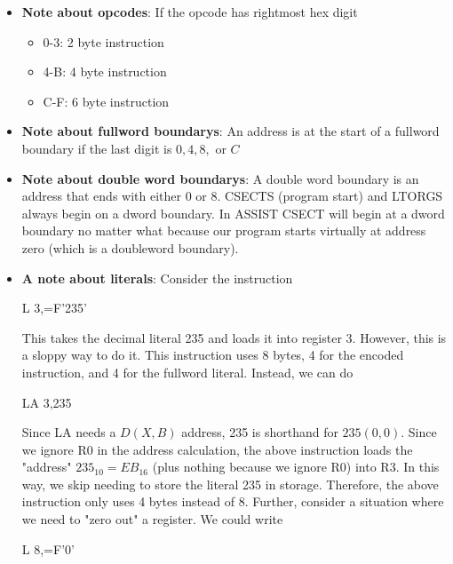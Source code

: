 \documentclass{report}
\begin{document}
\begin{itemize}
                \item \textbf{Note about opcodes}: If the opcode has rightmost hex digit
                    \begin{itemize}
                        \item 0-3: 2 byte instruction
                        \item 4-B: 4 byte instruction
                        \item C-F: 6 byte instruction
                    \end{itemize}
                \item \textbf{Note about fullword boundarys}: An address is at the start of a fullword boundary if the last digit is $0,4,8,$ or $C $
                \item \textbf{Note about double word boundarys}: A double word boundary is an address that ends with either 0 or 8.
                    \bigbreak \noindent 
                    CSECTS (program start) and LTORGS always begin on a dword boundary. In ASSIST CSECT will begin at a dword boundary no matter what because our program starts virtually at address zero (which is a doubleword boundary).
                \item \textbf{A note about literals}: Consider the instruction
                    \begin{cppcode}
                    L 3,=F'235'
                    \end{cppcode}
                    This takes the decimal literal 235 and loads it into register 3. However, this is a sloppy way to do it. This instruction uses 8 bytes, 4 for the encoded instruction, and 4 for the fullword literal. Instead, we can do
                    \bigbreak \noindent 
                    \begin{cppcode}
                    LA 3,235
                    \end{cppcode}
                    Since LA needs a $D(X,B)$ address, 235 is shorthand for $235(0,0)$. Since we ignore R0 in the address calculation, the above instruction loads the "address" $235_{10} = EB_{16}$ (plus nothing because we ignore R0) into R3. In this way, we skip needing to store the literal 235 in storage. Therefore, the above instruction only uses 4 bytes instead of 8.
                    \bigbreak \noindent 
                    Further, consider a situation where we need to "zero out" a register. We could write
                    \bigbreak \noindent 
                    \begin{cppcode}
                    L 8,=F'0'

\end{cppcode}
\end{itemize}
\end{document}
